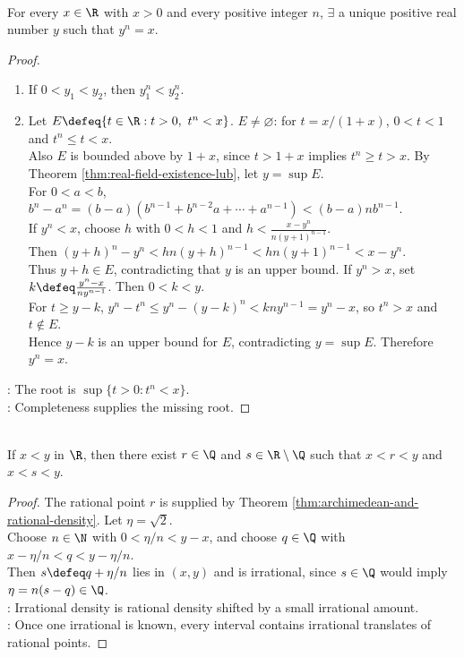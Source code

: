 \begin{theorem} \label{thm:nth-roots-positive-reals} \\
For every $x\in\R$ with $x>0$ and every positive integer $n$, $\exists$ a unique positive real number $y$ such that $y^n=x$.
\begin{proof}
\begin{enumerate}[label=(\roman*)]
\setlength{\itemsep}{0pt}
\item {} If $0<y_1<y_2$, then $y_1^n<y_2^n$.
\item {} Let $E\defeq\{t\in\R:t>0,\ t^n<x\}$. $E\neq\varnothing$: for $t=x/(1+x)$, $0<t<1$ and $t^n\leq t<x$.\\
Also $E$ is bounded above by $1+x$, since $t>1+x$ implies $t^n\geq t>x$. By Theorem \ref{thm:real-field-existence-lub}, let $y=\sup E$.\\
For $0<a<b$, $b^n-a^n=(b-a)(b^{n-1}+b^{n-2}a+\cdots+a^{n-1})<(b-a)nb^{n-1}$.\\
If $y^n<x$, choose $h$ with $0<h<1$ and $h<\frac{x-y^n}{n(y+1)^{n-1}}$.\\
Then $(y+h)^n-y^n<hn(y+h)^{n-1}<hn(y+1)^{n-1}<x-y^n$.\\
Thus $y+h\in E$, contradicting that $y$ is an upper bound. If $y^n>x$, set $k\defeq\frac{y^n-x}{ny^{n-1}}$. Then $0<k<y$.\\
For $t\geq y-k$, $y^n-t^n\leq y^n-(y-k)^n<kny^{n-1}=y^n-x$, so $t^n>x$ and $t\notin E$.\\
Hence $y-k$ is an upper bound for $E$, contradicting $y=\sup E$. Therefore $y^n=x$.
\end{enumerate}
: The root is $\sup\{t>0:t^n<x\}$.\\
: Completeness supplies the missing root.
\end{proof}
\end{theorem}

\begin{corollary} \label{cor:rationals-and-irrationals-dense} \\
If $x<y$ in $\R$, then there exist $r\in\Q$ and $s\in\R\setminus\Q$ such that $x<r<y$ and $x<s<y$.
\begin{proof}
The rational point $r$ is supplied by Theorem \ref{thm:archimedean-and-rational-density}. Let $\eta=\sqrt{2}$.\\
Choose $n\in\N$ with $0<\eta/n<y-x$, and choose $q\in\Q$ with $x-\eta/n<q<y-\eta/n$.\\
Then $s\defeq q+\eta/n$ lies in $(x,y)$ and is irrational, since $s\in\Q$ would imply $\eta=n(s-q)\in\Q$.\\
: Irrational density is rational density shifted by a small irrational amount.\\
: Once one irrational is known, every interval contains irrational translates of rational points.
\end{proof}
\end{corollary}

